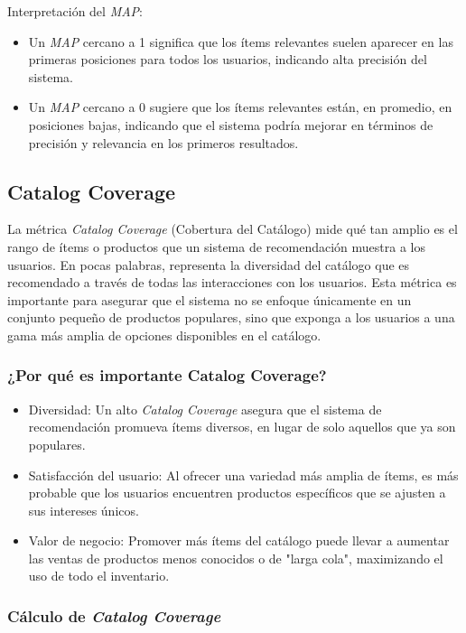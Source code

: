 \documentclass[11pt,a4paper,twoside]{thesis}
\begin{document}
Interpretación del \textit{MAP}:

\begin{itemize}
	\item Un \textit{MAP} cercano a 1 significa que los ítems relevantes suelen aparecer en las primeras posiciones para todos los usuarios, indicando alta precisión del sistema.
	\item Un \textit{MAP} cercano a 0 sugiere que los ítems relevantes están, en promedio, en posiciones bajas, indicando que el sistema podría mejorar en términos de precisión y relevancia en los primeros resultados.
\end{itemize}


\subsection{Catalog Coverage}

La métrica \textit{Catalog Coverage} (Cobertura del Catálogo) mide qué tan amplio es el rango de ítems o productos que un sistema de recomendación muestra a los usuarios. En pocas palabras, representa la diversidad del catálogo que es recomendado a través de todas las interacciones con los usuarios. Esta métrica es importante para asegurar que el sistema no se enfoque únicamente en un conjunto pequeño de productos populares, sino que exponga a los usuarios a una gama más amplia de opciones disponibles en el catálogo.

\subsubsection{¿Por qué es importante Catalog Coverage?}
\begin{itemize}
	\item Diversidad: Un alto \textit{Catalog Coverage} asegura que el sistema de recomendación promueva ítems diversos, en lugar de solo aquellos que ya son populares.
	\item Satisfacción del usuario: Al ofrecer una variedad más amplia de ítems, es más probable que los usuarios encuentren productos específicos que se ajusten a sus intereses únicos.
	\item Valor de negocio: Promover más ítems del catálogo puede llevar a aumentar las ventas de productos menos conocidos o de "larga cola", maximizando el uso de todo el inventario.
\end{itemize}



\subsubsection{Cálculo de \textit{Catalog Coverage}}
\end{document}
